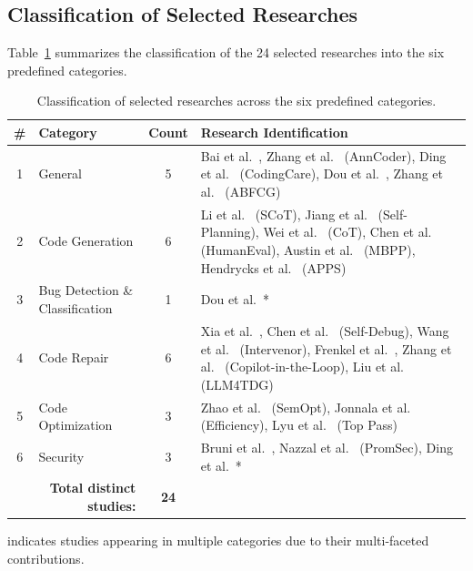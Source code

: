 \documentclass[11pt,a4paper]{article}
\begin{document}
\subsection{Classification of Selected Researches}
\label{sec:classification}

Table~\ref{tab:classification} summarizes the classification of the 24 selected researches into the six predefined categories.

\begin{table}[H]
\centering
\caption{Classification of selected researches across the six predefined categories.}
\label{tab:classification}
\small
\begin{tabular}{@{}clcp{7.5cm}@{}}
\toprule
\textbf{\#} & \textbf{Category} & \textbf{Count} & \textbf{Research Identification} \\
\midrule
1 & General & 5 & Bai et al.~\cite{bai2025agent}, Zhang et al.~\cite{zhang2025anncoder} (AnnCoder), Ding et al.~\cite{ding2025codingcare} (CodingCare), Dou et al.~\cite{dou2026}, Zhang et al.~\cite{zhang2025abfcg} (ABFCG) \\
\midrule
2 & Code Generation & 6 & Li et al.~\cite{li2025scot} (SCoT), Jiang et al.~\cite{jiang2024selfplan} (Self-Planning), Wei et al.~\cite{wei2022cot} (CoT), Chen et al.~\cite{chen2021humaneval} (HumanEval), Austin et al.~\cite{austin2021mbpp} (MBPP), Hendrycks et al.~\cite{hendrycks2021apps} (APPS) \\
\midrule
3 & Bug Detection \& Classification & 1 & Dou et al.~\cite{dou2026}* \\
\midrule
4 & Code Repair & 6 & Xia et al.~\cite{xia2023apr}, Chen et al.~\cite{chen2023selfdebug} (Self-Debug), Wang et al.~\cite{wang2024intervenor} (Intervenor), Frenkel et al.~\cite{frenkel2025apr}, Zhang et al.~\cite{zhang2024copilot} (Copilot-in-the-Loop), Liu et al.~\cite{liu2025llm4tdg} (LLM4TDG) \\
\midrule
5 & Code Optimization & 3 & Zhao et al.~\cite{zhao2025semopt} (SemOpt), Jonnala et al.~\cite{jonnala2025} (Efficiency), Lyu et al.~\cite{lyu2025toppass} (Top Pass) \\
\midrule
6 & Security & 3 & Bruni et al.~\cite{bruni2025}, Nazzal et al.~\cite{nazzal2024promsec} (PromSec), Ding et al.~\cite{ding2025codingcare}* \\
\midrule
\multicolumn{2}{r}{\textbf{Total distinct studies:}} & \textbf{24} & \\
\bottomrule
\end{tabular}
\begin{flushleft}
\footnotesize * indicates studies appearing in multiple categories due to their multi-faceted contributions.
\end{flushleft}
\end{table}
\end{document}
